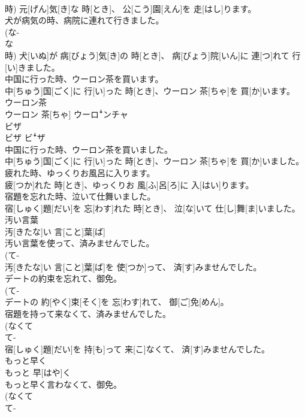 \documentclass[8pt]{extreport}
\begin{document}
\begin{CJK}{UTF8}{min}
\\	時)	元[げん]気[き]な 時[とき]、 公[こう]園[えん]を 走[はし]ります。
\\	犬が病気の時、病院に連れて行きました。	
\\	(な-
\\	な 
\\	時)	犬[いぬ]が 病[びょう]気[き]の 時[とき]、 病[びょう]院[いん]に 連[つ]れて 行[い]きました。
\\	中国に行った時、ウーロン茶を買います。	
\\	中[ちゅう]国[ごく]に 行[い]った 時[とき]、ウーロン 茶[ちゃ]を 買[か]います。
\\	ウーロン茶	
\\	ウーロン 茶[ちゃ]	ウーロꜜンチャ
\\	ビザ	
\\	ビザ	ビꜜザ
\\	中国に行った時、ウーロン茶を買いました。	
\\	中[ちゅう]国[ごく]に 行[い]った 時[とき]、ウーロン 茶[ちゃ]を 買[か]いました。
\\	疲れた時、ゆっくりお風呂に入ります。	
\\	疲[つか]れた 時[とき]、ゆっくりお 風[ふ]呂[ろ]に 入[はい]ります。
\\	宿題を忘れた時、泣いて仕舞いました。	
\\	宿[しゅく]題[だい]を 忘[わす]れた 時[とき]、 泣[な]いて 仕[し]舞[ま]いました。
\\	汚い言葉	
\\	汚[きたな]い 言[こと]葉[ば]	
\\	汚い言葉を使って、済みませんでした。	
\\	(て-
\\	汚[きたな]い 言[こと]葉[ば]を 使[つか]って、 済[す]みませんでした。
\\	デートの約束を忘れて、御免。	
\\	(て-
\\	デートの 約[やく]束[そく]を 忘[わす]れて、 御[ご]免[めん]。
\\	宿題を持って来なくて、済みませんでした。	
\\	(なくて 
\\	て-
\\	宿[しゅく]題[だい]を 持[も]って 来[こ]なくて、 済[す]みませんでした。
\\	もっと早く	
\\	もっと 早[はや]く	
\\	もっと早く言わなくて、御免。	
\\	(なくて 
\\	て-

\end{CJK}
\end{document}
